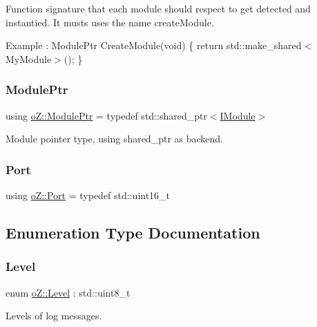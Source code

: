 Function signature that each module should respect to get detected and instantied. It musts uses the name \textquotesingle{}create\+Module\textquotesingle{}. 

Example \+: Module\+Ptr Create\+Module(void) \{ return std\+::make\+\_\+shared$<$\+My\+Module$>$(); \} \mbox{\label{namespaceo_z_af5a56aaaee027504979038f38991adcf}} 
\subsubsection{\texorpdfstring{ModulePtr}{ModulePtr}}
{\footnotesize\ttfamily using \mbox{\hyperlink{namespaceo_z_af5a56aaaee027504979038f38991adcf}{o\+Z\+::\+Module\+Ptr}} = typedef std\+::shared\+\_\+ptr$<$\mbox{\hyperlink{classo_z_1_1_i_module}{I\+Module}}$>$}



Module pointer type, using shared\+\_\+ptr as backend. 

\mbox{\label{namespaceo_z_afeccb82d451972ba3b7d2a32b066b30b}} 
\subsubsection{\texorpdfstring{Port}{Port}}
{\footnotesize\ttfamily using \mbox{\hyperlink{namespaceo_z_afeccb82d451972ba3b7d2a32b066b30b}{o\+Z\+::\+Port}} = typedef std\+::uint16\+\_\+t}



\subsection{Enumeration Type Documentation}
\mbox{\label{namespaceo_z_a72fc7662d5f07391ac6f0a5699014bfa}} 
\subsubsection{\texorpdfstring{Level}{Level}}
{\footnotesize\ttfamily enum \mbox{\hyperlink{namespaceo_z_a72fc7662d5f07391ac6f0a5699014bfa}{o\+Z\+::\+Level}} \+: std\+::uint8\+\_\+t}



Levels of log messages. 

